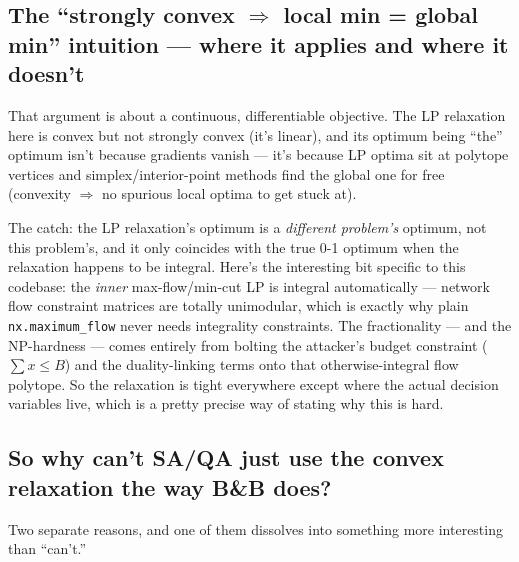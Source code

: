 \documentclass[11pt]{article}
\newcommand{\code}[1]{\texttt{#1}}
\begin{document}
\subsection*{The ``strongly convex $\Rightarrow$ local min = global min'' intuition --- where it applies and where it doesn't}

That argument is about a continuous, differentiable objective. The LP relaxation here is convex but not strongly convex (it's linear), and its optimum being ``the'' optimum isn't because gradients vanish --- it's because LP optima sit at polytope vertices and simplex/interior-point methods find the global one for free (convexity $\Rightarrow$ no spurious local optima to get stuck at).

The catch: the LP relaxation's optimum is a \emph{different problem's} optimum, not this problem's, and it only coincides with the true 0-1 optimum when the relaxation happens to be integral. Here's the interesting bit specific to this codebase: the \emph{inner} max-flow/min-cut LP is integral automatically --- network flow constraint matrices are totally unimodular, which is exactly why plain \code{nx.maximum\_flow} never needs integrality constraints. The fractionality --- and the NP-hardness --- comes entirely from bolting the attacker's budget constraint ($\sum x \le B$) and the duality-linking terms onto that otherwise-integral flow polytope. So the relaxation is tight everywhere except where the actual decision variables live, which is a pretty precise way of stating why this is hard.

\subsection*{So why can't SA/QA just use the convex relaxation the way B\&B does?}

Two separate reasons, and one of them dissolves into something more interesting than ``can't.''
\end{document}
